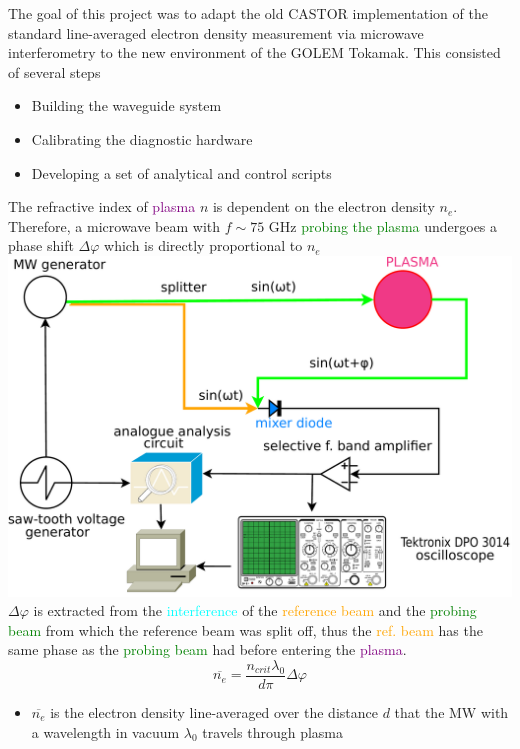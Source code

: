 \documentclass[portrait,final,a0paper]{baposter}
\newcommand{\compresslist}{%
\setlength{\itemsep}{1pt}%
\setlength{\parskip}{0pt}%
\setlength{\parsep}{0pt}%
}
\begin{document}
\begin{poster}
{The goal of this project was to adapt the old CASTOR implementation of the standard line-averaged electron density measurement via microwave interferometry to the new environment of the GOLEM Tokamak. This consisted of several steps
\begin{itemize}
        \compresslist
    \item Building the waveguide system
    \item Calibrating the diagnostic hardware 
    \item Developing a set of analytical and control scripts
\end{itemize}
 }

 {
 \begin{multicols}{2} The refractive index of \textcolor{purple}{plasma} $n$ is dependent on the electron density $n_e$. Therefore, a microwave beam with $f \sim 75$ GHz \textcolor{green}{probing the plasma} undergoes a phase shift $\Delta \varphi$ which is directly proportional to $n_e$
\includegraphics[width=.5\textwidth]{schema.pdf}
$\Delta \varphi$ is extracted from the \textcolor{cyan}{interference} of the \textcolor{orange}{reference beam} and the \textcolor{green}{probing beam} from which the reference beam was split off, thus the \textcolor{orange}{ref. beam} has the same phase as the \textcolor{green}{probing beam} had before entering the \textcolor{purple}{plasma}.
\begin{equation}
    \overline{n_e}=\frac{ n_{crit}\lambda_0 }{d \pi}\Delta \varphi
    \label{eq:ne}
\end{equation}
\begin{itemize}
        \compresslist
    \item $\overline{n_e}$ is the electron density line-averaged over the distance $d$ that the MW with a wavelength in vacuum $\lambda_0$ travels through plasma



\end{itemize}
\end{multicols}}
\end{poster}
\end{document}
